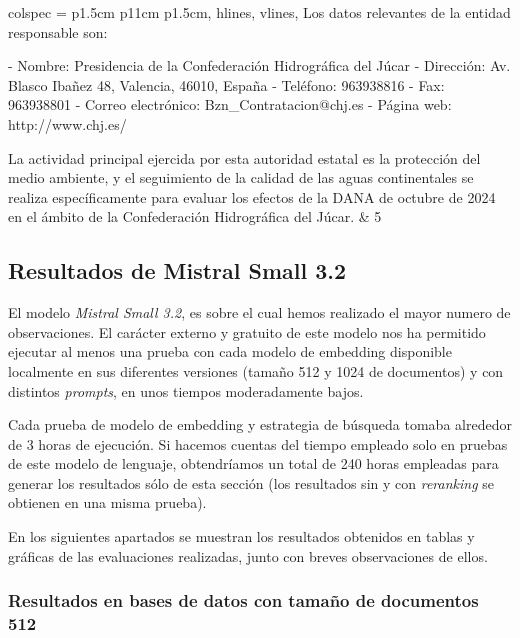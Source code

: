 \begin{table}[H]
\begin{tblr}{
    				colspec = {p{1.5cm} p{11cm} p{1.5cm}},
    				hlines,
    				vlines,
    			}
    			Los datos relevantes de la entidad responsable son:
    			
    			- Nombre: Presidencia de la Confederación Hidrográfica del Júcar
    			- Dirección: Av. Blasco Ibañez 48, Valencia, 46010, España
    			- Teléfono: 963938816
    			- Fax: 963938801
    			- Correo electrónico: Bzn\_Contratacion@chj.es
    			- Página web: http://www.chj.es/
    			
    			La actividad principal ejercida por esta autoridad estatal es la protección del medio ambiente, y el seguimiento de la calidad de las aguas continentales se realiza específicamente para evaluar los efectos de la DANA de octubre de 2024 en el ámbito de la Confederación Hidrográfica del Júcar. & 5 \\       			 		    			
    		\end{tblr}
    		\caption{Comparativa de respuestas a pregunta 3}
    		\label{tab:evo_preg3}
    	\end{table} 
    	
    	\subsection{Resultados de Mistral Small 3.2}
    	
    		El modelo \textit{Mistral Small 3.2}, es sobre el cual hemos realizado el mayor numero de observaciones. El carácter externo y gratuito de este modelo nos ha permitido ejecutar al menos una prueba con cada modelo de embedding disponible localmente en sus diferentes versiones (tamaño 512 y 1024 de documentos) y con distintos \textit{prompts}, en unos tiempos moderadamente bajos. 
    		
    		\noindent Cada prueba de modelo de embedding y estrategia de búsqueda tomaba alrededor de 3 horas de ejecución. Si hacemos cuentas del tiempo empleado solo en pruebas de este modelo de lenguaje, obtendríamos un total de 240 horas empleadas para generar los resultados sólo de esta sección (los resultados sin y con \textit{reranking} se obtienen en una misma prueba).
    		
    		\noindent En los siguientes apartados se muestran los resultados obtenidos en tablas y gráficas de las evaluaciones realizadas, junto con breves observaciones de ellos.
    	
    		\subsubsection{Resultados en bases de datos con tamaño de documentos 512}
    		

